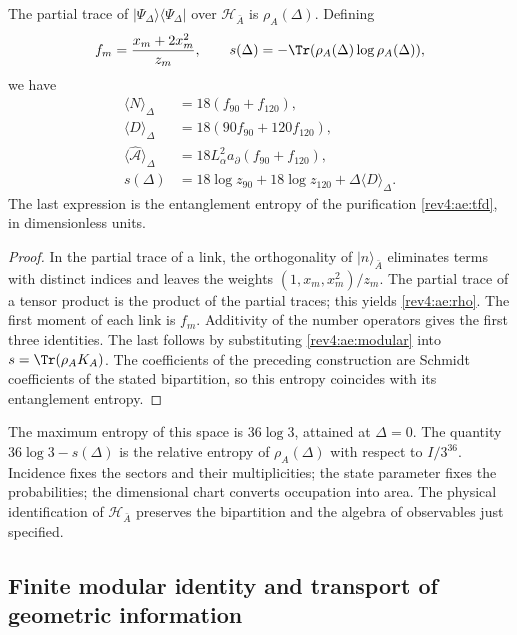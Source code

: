 \begin{proposition}
\label{rev4:ae:entropia}
The partial trace of \(|\Psi_\Delta\rangle\langle\Psi_\Delta|\)
over \(\mathscr H_{\bar A}\) is \(\rho_A(\Delta)\). Defining
\[
 f_m=\frac{x_m+2x_m^2}{z_m},
 \qquad s(\Delta)=-\Tr(\rho_A(\Delta)\log\rho_A(\Delta)),
\]
we have
\begin{align}
 \langle N\rangle_\Delta&=18(f_{90}+f_{120}),\\
 \langle D\rangle_\Delta&=18(90f_{90}+120f_{120}),\\
 \langle\widehat{\mathcal A}\rangle_\Delta
 &=18L_\alpha^2a_\partial(f_{90}+f_{120}),\\
 s(\Delta)&=18\log z_{90}+18\log z_{120}
             +\Delta\langle D\rangle_\Delta.
 \label{rev4:ae:entropia-formula}
\end{align}
The last expression is the entanglement entropy of the
purification \eqref{rev4:ae:tfd}, in dimensionless units.
\end{proposition}
\begin{proof}
In the partial trace of a link, the orthogonality of
\(|n\rangle_{\bar A}\) eliminates terms with distinct indices and
leaves the weights \((1,x_m,x_m^2)/z_m\). The partial trace of a tensor
product is the product of the partial traces; this yields
\eqref{rev4:ae:rho}. The first moment of each link is \(f_m\).
Additivity of the number operators gives the first three identities.
The last follows by substituting \eqref{rev4:ae:modular} into
\(s=\Tr(\rho_AK_A)\). The coefficients of the preceding construction
are Schmidt coefficients of the stated bipartition, so
this entropy coincides with its entanglement entropy.
\end{proof}

The maximum entropy of this space is \(36\log3\), attained at
\(\Delta=0\). The quantity \(36\log3-s(\Delta)\) is the
relative entropy of \(\rho_A(\Delta)\) with respect to
\(I/3^{36}\). Incidence fixes the sectors and their multiplicities;
the state parameter fixes the probabilities; the dimensional chart
converts occupation into area. The physical identification of
\(\mathscr H_{\bar A}\) preserves the bipartition and the algebra of
observables just specified.

\subsection{Finite modular identity and transport of geometric information}

